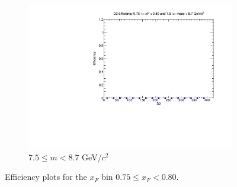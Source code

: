 \documentclass[11pt]{article}
\begin{document}
\begin{figure}[p]
\begin{subfigure}[b]{0.32\textwidth}
        \includegraphics[width=\textwidth]{./kTrackerEfficiencyPlots/D2_Efficiency_xF15_mass10.pdf}
        \caption{$7.5 \leq m < 8.7$ GeV/$c^2$}
    \end{subfigure}
    \caption{Efficiency plots for the $x_F$ bin $0.75 \leq x_F < 0.80$.}
\end{figure}
\end{document}
